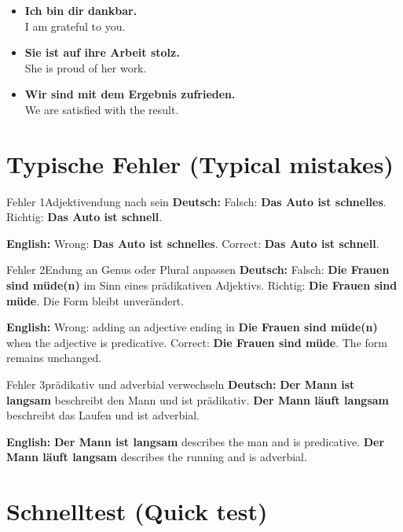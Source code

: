 \documentclass[a4paper,11pt]{article}
\newcommand{\GermanText}[1]{\textbf{Deutsch: }#1\par}
\newcommand{\EnglishText}[1]{{\small\color{SoftGray}\textbf{English: }#1\par}}
\newcommand{\ExampleItem}[2]{\item \textbf{#1}\\{\small\color{SoftGray}#2}}
\begin{document}
        \begin{exbox}
            \begin{itemize}
                \ExampleItem{Ich bin dir dankbar.}{I am grateful to you.}
                \ExampleItem{Sie ist auf ihre Arbeit stolz.}{She is proud of her work.}
                \ExampleItem{Wir sind mit dem Ergebnis zufrieden.}{We are satisfied with the result.}
            \end{itemize}
        \end{exbox}

    \section{Typische Fehler \textnormal{(Typical mistakes)}}

        \begin{grammarentry}{Fehler 1}{Adjektivendung nach sein}
            \GermanText{Falsch: \textbf{Das Auto ist schnelles}. Richtig: \textbf{Das Auto ist schnell}.}
            \EnglishText{Wrong: \textbf{Das Auto ist schnelles}. Correct: \textbf{Das Auto ist schnell}.}
        \end{grammarentry}

        \begin{grammarentry}{Fehler 2}{Endung an Genus oder Plural anpassen}
            \GermanText{Falsch: \textbf{Die Frauen sind müde(n)} im Sinn eines prädikativen Adjektivs. Richtig: \textbf{Die Frauen sind müde}. Die Form bleibt unverändert.}
            \EnglishText{Wrong: adding an adjective ending in \textbf{Die Frauen sind müde(n)} when the adjective is predicative. Correct: \textbf{Die Frauen sind müde}. The form remains unchanged.}
        \end{grammarentry}

        \begin{grammarentry}{Fehler 3}{prädikativ und adverbial verwechseln}
            \GermanText{\textbf{Der Mann ist langsam} beschreibt den Mann und ist prädikativ. \textbf{Der Mann läuft langsam} beschreibt das Laufen und ist adverbial.}
            \EnglishText{\textbf{Der Mann ist langsam} describes the man and is predicative. \textbf{Der Mann läuft langsam} describes the running and is adverbial.}
        \end{grammarentry}

    \section{Schnelltest \textnormal{(Quick test)}}
\end{document}
